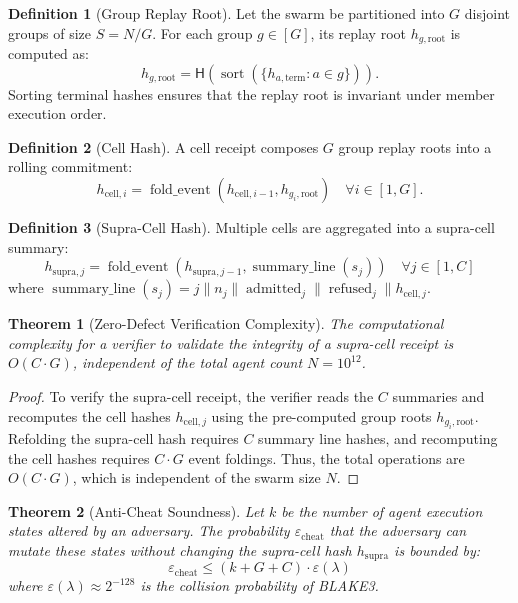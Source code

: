 \documentclass[11pt,oneside]{book}
\theoremstyle{definition}
\newtheorem{definition}{Definition}[chapter]
\theoremstyle{plain}
\newtheorem{theorem}{Theorem}[chapter]
\theoremstyle{remark}
\newcommand{\chainH}{\mathsf{H}}               %
\begin{document}
\begin{definition}[Group Replay Root]\label{def:group_root}
Let the swarm be partitioned into $G$ disjoint groups of size $S = N/G$. %
For each group $g \in [G]$, its replay root $h_{g,\mathrm{root}}$ is computed as:
\[
h_{g,\mathrm{root}} = \chainH(\operatorname{sort}(\{ h_{a,\mathrm{term}} : a \in g \})).
\]
Sorting terminal hashes ensures that the replay root is invariant under member execution order. %
\end{definition}

\begin{definition}[Cell Hash]\label{def:cell_hash}
A cell receipt composes $G$ group replay roots into a rolling commitment:
\[
h_{\mathrm{cell}, i} = \operatorname{fold\_event}(h_{\mathrm{cell}, i-1}, h_{g_i,\mathrm{root}}) \quad \forall i \in [1, G].
\]
\end{definition}

\begin{definition}[Supra-Cell Hash]\label{def:supra_hash}
Multiple cells are aggregated into a supra-cell summary:
\[
h_{\mathrm{supra}, j} = \operatorname{fold\_event}(h_{\mathrm{supra}, j-1}, \operatorname{summary\_line}(s_j)) \quad \forall j \in [1, C]
\]
where $\operatorname{summary\_line}(s_j) = j \parallel n_j \parallel \operatorname{admitted}_j \parallel \operatorname{refused}_j \parallel h_{\mathrm{cell}, j}$. %
\end{definition}

\begin{theorem}[Zero-Defect Verification Complexity]\label{thm:zero_defect}
The computational complexity for a verifier to validate the integrity of a supra-cell receipt is $O(C \cdot G)$, independent of the total agent count $N = 10^{12}$. %
\end{theorem}

\begin{proof}
To verify the supra-cell receipt, the verifier reads the $C$ summaries and recomputes the cell hashes $h_{\mathrm{cell}, j}$ using the pre-computed group roots $h_{g_i,\mathrm{root}}$. %
Refolding the supra-cell hash requires $C$ summary line hashes, and recomputing the cell hashes requires $C \cdot G$ event foldings. %
Thus, the total operations are $O(C \cdot G)$, which is independent of the swarm size $N$. %
\end{proof}

\begin{theorem}[Anti-Cheat Soundness]\label{thm:anti_cheat}
Let $k$ be the number of agent execution states altered by an adversary. %
The probability $\varepsilon_{\mathrm{cheat}}$ that the adversary can mutate these states without changing the supra-cell hash $h_{\mathrm{supra}}$ is bounded by:
\[
\varepsilon_{\mathrm{cheat}} \le (k + G + C) \cdot \varepsilon(\lambda)
\]
where $\varepsilon(\lambda) \approx 2^{-128}$ is the collision probability of BLAKE3. %
\end{theorem}
\end{document}
